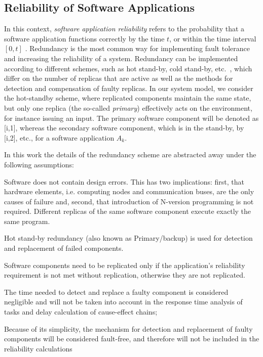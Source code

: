 \subsection{Reliability of Software Applications}\label{sub_reliability}
In this context, \textit{software application reliability} refers to the probability that a software application functions correctly by the time $t$, or within the time interval $[0, t]$ \cite{Goel1985SoftwareApplicability}. Redundancy is the most common way for implementing fault tolerance and increasing the reliability of a system. Redundancy can be implemented according to different schemes, such as hot stand-by, cold stand-by, etc.~\cite{Dubrova2013Fault-tolerantDesign}, which differ on the number of replicas that are active as well as the methods for detection and compensation of faulty replicas. In our system model, we consider the hot-standby scheme, where replicated components maintain the same state, but only one replica (the so-called \textit{primary}) effectively acts on the environment, for instance issuing an input. The primary software component will be denoted as [i,1], whereas the secondary software component, which is in the stand-by, by [i,2], etc., for a software application $A_k$.



In this work the details of the redundancy scheme are abstracted away under the following assumptions:
\begin{enumerate*}[label=(\roman*)]
    \item Software does not contain design errors. This has two implications: first, that hardware elements, i.e. computing nodes and communication buses, are the only causes of failure and, second, that introduction of N-version programming is not required. Different replicas of the same software component execute exactly the same program.
	\item Hot stand-by redundancy (also known as Primary/backup) is used for detection and replacement of failed components.
	\item Software components need to be replicated only if the application's reliability requirement is not met without replication, otherwise they are not replicated.
	\item The time needed to detect and replace a faulty component is considered negligible and will not be taken into account in the response time analysis of tasks and delay calculation of cause-effect chains;
	\item Because of its simplicity, the mechanism for detection and replacement of faulty components will be considered fault-free, and therefore will not be included in the reliability calculations
\end{enumerate*}

